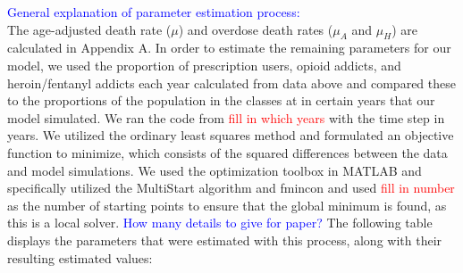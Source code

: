 \documentclass[12pt]{article}
\begin{document}
\textcolor{blue}{General explanation of parameter estimation process:} \\
The age-adjusted death rate ($\mu$) and overdose death rates ($\mu_{A}$ and $\mu_{H}$) are calculated in Appendix A. In order to estimate the remaining parameters for our model, we used the proportion of prescription users, opioid addicts, and heroin/fentanyl addicts each year calculated from data above and compared these to the proportions of the population in the classes at in certain years that our model simulated. We ran the code from \textcolor{red}{fill in which years} with the time step in years. We utilized the ordinary least squares method and formulated an objective function to minimize, which consists of the squared differences between the data and model simulations. We used the optimization toolbox in MATLAB and specifically utilized the MultiStart algorithm and fmincon and used \textcolor{red}{fill in number} as the number of starting points to ensure that the global minimum is found, as this is a local solver. \textcolor{blue}{How many details to give for paper?} The following table displays the parameters that were estimated with this process, along with their resulting estimated values: 
\end{document}
